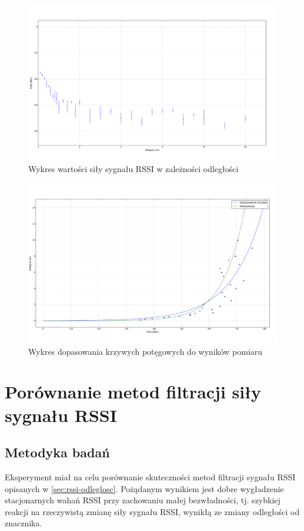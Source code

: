 \begin{figure}[ht]
\centering
\includegraphics[width=1\textwidth]{img/odleglosc-rssi.png}
\caption{Wykres wartości siły sygnału RSSI w zależności odległości}
\label{fig:odleglosc-rssi}
\end{figure}


\begin{figure}[ht]
\centering
\includegraphics[width=1\textwidth]{img/rssi-odleglosc.png}
\caption{Wykres dopasowania krzywych potęgowych do wyników pomiaru}
\label{fig:odleglosc-rssi-fit}
\end{figure}

\section{Porównanie metod filtracji siły sygnału RSSI}
\label{sec:testy-filtracja}
\subsection{Metodyka badań}
Eksperyment miał na celu porównanie skuteczności metod filtracji sygnału RSSI opisanych w \ref{sec:rssi-odleglosc}. Pożądanym wynikiem jest dobre wygładzenie stacjonarnych wahań RSSI przy zachowaniu małej bezwładności, tj. szybkiej reakcji na rzeczywistą zmianę siły sygnału RSSI, wynikłą ze zmiany odległości od znacznika. 

